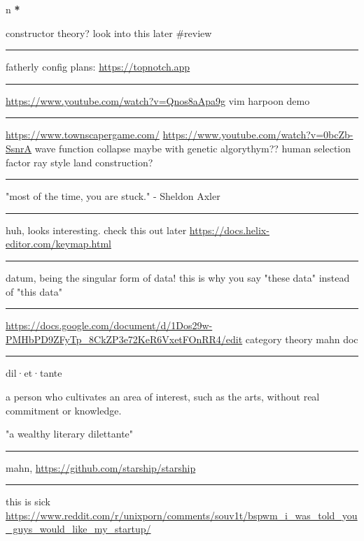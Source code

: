 \documentclass[letterpaper]{article}
\date{\today}
\title{}
\renewcommand{\tableofcontents}{}
\begin{document}
\tableofcontents

n \textbf{*}

constructor theory? look into this later \#review

\noindent\rule{\textwidth}{0.5pt}

fatherly config plans: \url{https://topnotch.app}

\noindent\rule{\textwidth}{0.5pt}

\url{https://www.youtube.com/watch?v=Qnos8aApa9g} vim harpoon demo

\noindent\rule{\textwidth}{0.5pt}

\href{https://www.youtube.com/redirect?event=video\_description\&redir\_token=QUFFLUhqbWU5b05DZzZyX0syeGltbVAzSUZGWkFySTFEZ3xBQ3Jtc0tuX1VZUTFUcHFsaklnd2FFYnlFV1pseDU3Q1hxMm40aWcybXVtMGNkVXhrYWVQaThuY0E2dXJNR2dkVm1rZ3A3NkVTZ2pJWEhVblVDV0ZKcXdFdFZTdHA5b3V4aXExVWFRLXVpeVhtSlpnNDhBYjU5Yw\&q=https\%3A\%2F\%2Fwww.townscapergame.com\%2F}{https://www.townscapergame.com/}
\url{https://www.youtube.com/watch?v=0bcZb-SsnrA} wave function collapse maybe
with genetic algorythym?? human selection factor ray style land
construction?

\noindent\rule{\textwidth}{0.5pt}

"most of the time, you are stuck." - Sheldon Axler

\noindent\rule{\textwidth}{0.5pt}

huh, looks interesting. check this out later
\url{https://docs.helix-editor.com/keymap.html}

\noindent\rule{\textwidth}{0.5pt}

datum, being the singular form of data! this is why you say "these data"
instead of "this data"

\noindent\rule{\textwidth}{0.5pt}

\url{https://docs.google.com/document/d/1Dos29w-PMHbPD9ZFyTp\_8CkZP3e72KeR6VxetFOnRR4/edit}
category theory mahn doc

\noindent\rule{\textwidth}{0.5pt}

dil·et·tante

a person who cultivates an area of interest, such as the arts, without
real commitment or knowledge.

"a wealthy literary dilettante"

\noindent\rule{\textwidth}{0.5pt}

mahn, \url{https://github.com/starship/starship}

\noindent\rule{\textwidth}{0.5pt}

this is sick
\url{https://www.reddit.com/r/unixporn/comments/souv1t/bspwm\_i\_was\_told\_you\_guys\_would\_like\_my\_startup/}
\end{document}
